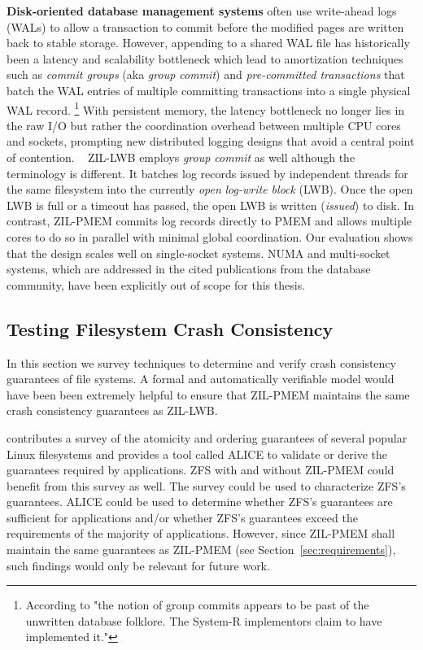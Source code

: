 \documentclass[12pt,a4paper,twoside]{book}
\begin{document}
\textbf{Disk-oriented database management systems} often use write-ahead logs (WALs) to allow a transaction to commit before the modified pages are written back to stable storage.
However, appending to a shared WAL file has historically been a latency and scalability bottleneck which lead to amortization techniques such as \textit{commit groups} (aka \textit{group commit}) and \textit{pre-committed transactions} that batch the WAL entries of multiple committing transactions into a single physical WAL record.%
\footnote{According to \cite{dewittImplementationTechniquesMain1984} "the notion of gronp commits appears to be past of the unwritten database folklore. The System-R implementors claim to have implemented it."}
With persistent memory, the latency bottleneck no longer lies in the raw I/O but rather the coordination overhead between multiple CPU cores and sockets, prompting new distributed logging designs that avoid a central point of contention.%
~\cite{fangHighPerformanceDatabase2011,pelleyStorageManagementNVRAM2013,johnsonAetherScalableApproach2010}
ZIL-LWB employs \textit{group commit} as well although the terminology is different.
It batches log records issued by independent threads for the same filesystem into the currently \textit{open} \textit{log-write block} (LWB).
Once the open LWB is full or a timeout has passed, the open LWB is written (\textit{issued}) to disk.
In contrast, ZIL-PMEM commits log records directly to PMEM and allows multiple cores to do so in parallel with minimal global coordination.
Our evaluation shows that the design scales well on single-socket systems.
NUMA and multi-socket systems, which are addressed in the cited publications from the database community, have been explicitly out of scope for this thesis.

\subsection{Testing Filesystem Crash Consistency}
In this section we survey techniques to determine and verify crash consistency guarantees of file systems.
A formal and automatically verifiable model would have been been extremely helpful to ensure that ZIL-PMEM maintains the same crash consistency guarantees as ZIL-LWB.

 contributes a survey of the atomicity and ordering guarantees of several popular Linux filesystems and provides a tool called ALICE to validate or derive the guarantees required by applications.
ZFS with and without ZIL-PMEM could benefit from this survey as well.
The survey could be used to characterize ZFS’s guarantees.
ALICE could be used to determine whether ZFS’s guarantees are sufficient for applications and/or whether ZFS’s guarantees exceed the requirements of the majority of applications.
However, since ZIL-PMEM shall maintain the same guarantees as ZIL-PMEM (see Section~\ref{sec:requirements}), such findings would only be relevant for future work.
\end{document}
